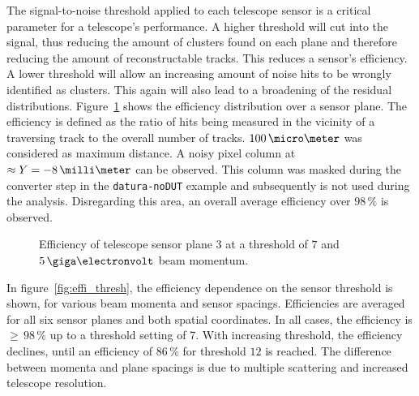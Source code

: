 The signal-to-noise threshold applied to each telescope sensor is a critical
parameter for a telescope's performance. A higher threshold will cut into the
signal, thus reducing the amount of clusters found on each plane and therefore
reducing the amount of reconstructable tracks. This reduces a sensor's
efficiency. A lower threshold will allow an increasing amount of noise hits to
be wrongly identified as clusters. This again will also lead to a broadening of
the residual distributions. Figure~\ref{fig:effi} shows the efficiency
distribution over a sensor plane. The efficiency is defined as the ratio of hits
being measured in the vicinity of a traversing track to the overall number of
tracks. $100\,\micro\meter$ was considered as maximum distance. A noisy pixel
column at $\approx Y = -8\,\milli\meter$ can be observed. This column was masked
during the converter step in the \texttt{datura-noDUT} example and subsequently
is not used during the analysis. Disregarding this area, an overall average
efficiency over $98\,\%$ is observed.\\

\begin{figure}[hbtp]
\centering
\caption[Telescope sensor efficiency]{Efficiency of telescope sensor plane $3$
at a threshold of $7$ and $5\,\giga\electronvolt$ beam momentum.}
\label{fig:effi}
\end{figure}

In figure~\ref{fig:effi_thresh}, the efficiency dependence on the sensor
threshold is shown, for various beam momenta and sensor spacings. Efficiencies
are averaged for all six sensor planes and both spatial coordinates. In all
cases, the efficiency is $\ge\,98\,\%$ up to a threshold setting of 7. With
increasing threshold, the efficiency declines, until an efficiency of $86\,\%$
for threshold $12$ is reached. The difference between momenta and plane spacings
is due to multiple scattering and increased telescope resolution.\\

